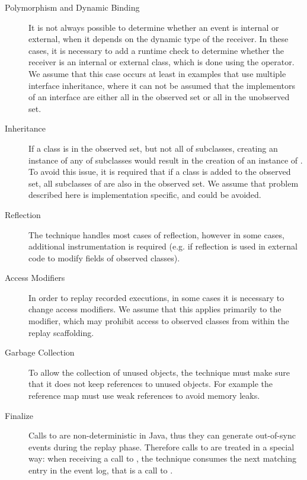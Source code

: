 \begin{description}
 \item [Polymorphism and Dynamic Binding] It is not always possible to determine whether an event is internal or external, when it depends on the dynamic type of the receiver. In these cases, it is necessary to add a runtime check to determine whether the receiver is an internal or external class, which is done using the  operator. We assume that this case occurs at least in examples that use multiple interface inheritance, where it can not be assumed that the implementors of an interface are either all in the observed set or all in the unobserved set.
 \item [Inheritance] If a class  is in the observed set, but not all of  subclasses, creating an instance of any of  subclasses would result in the creation of an instance of . To avoid this issue, it is required that if a class  is added to the observed set, all subclasses of  are also in the observed set. We assume that problem described here is implementation specific, and could be avoided.
 \item [Reflection] The technique handles most cases of reflection, however in some cases, additional instrumentation is required (e.g. if reflection is used in external code to modify fields of observed classes). 
 \item [Access Modifiers] In order to replay recorded executions, in some cases it is necessary to change access modifiers. We assume that this applies primarily to the  modifier, which may prohibit access to observed classes from within the replay scaffolding.
 \item [Garbage Collection] To allow the collection of unused objects, the technique must make sure that it does not keep references to unused objects. For example the reference map must use weak references to avoid memory leaks.
 \item [Finalize] Calls to  are non-deterministic in Java, thus they can generate out-of-sync events during the replay phase. Therefore calls to  are treated in a special way: when receiving a call to , the technique consumes the next matching entry in the event log, that is a call to .
\end{description}
